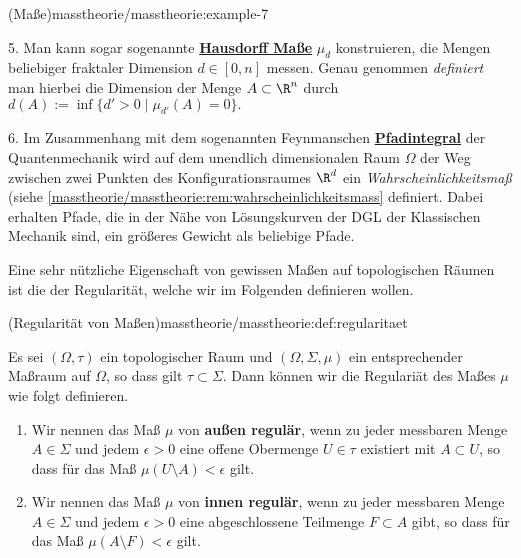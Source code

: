 \documentclass[letterpaper,10pt,german]{jupyterBook}
\begin{document}
\begin{example}{(Maße)}{masstheorie/masstheorie:example-7}
\par
5. Man kann sogar sogenannte \href{https://de.wikipedia.org/wiki/Hausdorff-Ma\%c3\%9f}{\textbf{Hausdorff Maße}} \(\mu_d\) konstruieren, die Mengen beliebiger fraktaler Dimension \(d\in[0,n]\) messen.
Genau genommen \emph{definiert} man hierbei die Dimension der Menge \(A\subset \R^n\) durch \(d(A):=\inf\{d'>0\mid \mu_{d'}(A)=0\}.\)

\par
6. Im Zusammenhang mit dem sogenannten Feynmanschen \href{https://de.wikipedia.org/wiki/Pfadintegral}{\textbf{Pfadintegral}} der Quantenmechanik wird auf dem unendlich dimensionalen Raum \(\Omega\) der Weg zwischen zwei Punkten des Konfigurationsraumes \(\R^d\) ein \emph{Wahrscheinlichkeitsmaß} (siehe \cref{masstheorie/masstheorie:rem:wahrscheinlichkeitsmass}  definiert.
Dabei erhalten Pfade, die in der Nähe von Lösungskurven der DGL der Klassischen Mechanik sind, ein größeres Gewicht als beliebige Pfade.
\end{example}

\par
Eine sehr nützliche Eigenschaft von gewissen Maßen auf topologischen Räumen ist die der Regularität, welche wir im Folgenden definieren wollen.
\begin{definition}{(Regularität von Maßen)}{masstheorie/masstheorie:def:regularitaet}



\par
Es sei \((\Omega, \tau)\) ein topologischer Raum und \((\Omega, \Sigma, \mu)\) ein entsprechender Maßraum auf \(\Omega\), so dass gilt \(\tau \subset \Sigma\).
Dann können wir die Regulariät des Maßes \(\mu\) wie folgt definieren.
\begin{enumerate}

\item {} 
\par
Wir nennen das Maß \(\mu\) von \textbf{außen regulär}, wenn zu jeder messbaren Menge \(A \in \Sigma\) und jedem \(\epsilon > 0\) eine offene Obermenge \(U \in \tau\) existiert mit \(A \subset U\), so dass für das Maß \(\mu(U\setminus A) < \epsilon\) gilt.

\item {} 
\par
Wir nennen das Maß \(\mu\) von \textbf{innen regulär}, wenn zu jeder messbaren Menge \(A \in \Sigma\) und jedem \(\epsilon > 0\) eine abgeschlossene Teilmenge \(F \subset A\) gibt, so dass für das Maß \(\mu(A\setminus F) < \epsilon\) gilt.

\end{enumerate}
\end{definition}
\end{document}
